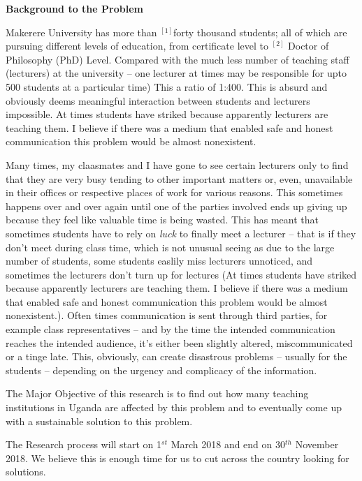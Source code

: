\documentclass{article} %
\begin{document}


\noindent \textbf{Background to the Problem}

\noindent Makerere University has more than ${}^{[1] }$forty thousand students; all of which are pursuing different levels of education, from certificate level to ${}^{[2]}$ Doctor of Philosophy (PhD) Level. Compared with the much less\textit{ }number of teaching staff (lecturers) at the university -- one lecturer at times may be responsible for upto 500 students at a particular time) This a ratio of 1:400. This is absurd and obviously deems meaningful interaction between students and lecturers impossible. At times students have striked because apparently lecturers are teaching them. I believe if there was a medium that enabled safe and honest communication this problem would be almost nonexistent. 

\noindent Many times, my claasmates and I have gone to see certain lecturers only to find that they are very busy tending to other important matters or, even, unavailable in their offices or respective places of work for various reasons. This sometimes happens over and over again until one of the parties involved ends up giving up because they feel like valuable time is being wasted. This has meant that sometimes students have to rely on \textit{luck }to finally meet a lecturer -- that is if they don't meet during class time, which is not unusual seeing as due to the large number of students, some students easlily miss lecturers unnoticed, and sometimes the lecturers don't turn up for lectures (At times students have striked because apparently lecturers are teaching them. I believe if there was a medium that enabled safe and honest communication this problem would be almost nonexistent.). Often times communication is sent through third parties, for example class representatives -- and by the time the intended communication reaches the intended audience, it's either been slightly altered, miscommunicated or a tinge late. This, obviously, can create disastrous problems -- usually for the students -- depending on the urgency and complicacy of the information. 

\noindent The Major Objective of this research is to find out how many teaching institutions in Uganda are affected by this problem and to eventually come up with a sustainable solution to this problem. 

\noindent The Research process will start on 1${}^{st}$ March 2018 and end on 30${}^{th}$ November 2018. We believe this is enough time for us to cut across the country looking for solutions. 
\end{document}
